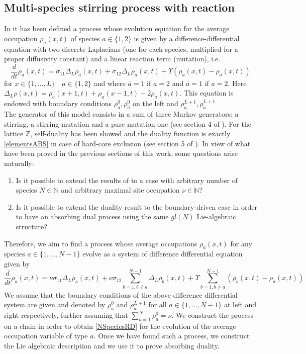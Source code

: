 \documentclass[10pt]{article}
\numberwithin{equation}{section}
\numberwithin{equation}{subsection}
\begin{document}
\subsection{Multi-species stirring process with reaction} \label{Subsection-RD}
In \cite{casini2022uphill} it has been defined a process whose evolution equation for the average occupation $\rho_{a}(x,t)$ of species $a\in \{1,2\}$ is given by a difference-differential equation with two discrete Laplacians (one for each species, multiplied for a proper diffusivity constant) and a linear reaction term (mutation), i.e.
\begin{equation}\label{2SpeciesRD}
	\frac{d}{dt} \rho_{a}(x,t)=\sigma_{11}\Delta_{L}\rho_{a}(x,t)+\sigma_{12}\Delta_{L}\rho_{\overline{a}}(x,t)+\Upsilon\left(\rho_{\overline{a}}(x,t)-\rho_{a}(x,t)\right)
\end{equation} 
for $ x\in\{1,\ldots,L\}\quad a\in\{1,2\}$  and where $\overline{a}=1$ if $a=2$ and $\overline{a}=1$ if $a=2$. Here $\Delta_{L}\rho(x,t)=\rho_{a}(x+1,t)+\rho_{a}(x-1,t)-2\rho_{a}(x,t)$.
This equation is endowed with boundary conditions $\rho_{a}^{0},\rho_{\overline{a}}^{0}$ on the left and $\rho_{a}^{L+1},\rho_{\overline{a}}^{L+1}$ \\The generator of this model consists in a sum of three Markov generators: a stirring, a stirring-mutation and a pure mutation one (see section 4 of \cite{casini2022uphill}). For the lattice $\mathbb{Z}$, self-duality has been showed and the duality function is exactly \eqref{elementsABS} in case of hard-core exclusion (see section 5 of \cite{casini2022uphill}). In view of what have been proved in the previous sections of this work, some questions arise naturally:
\begin{enumerate}
		\item Is it possible to extend the results of \cite{casini2022uphill} to a case with arbitrary number of species $N\in \mathbb{N}$ and arbitrary maximal site occupation $\nu\in \mathbb{N}$?
			\item Is it possible to extend the duality result to the boundary-driven case in order to have an absorbing dual process using the same $gl(N)$ Lie-algebraic structure?
\end{enumerate}
Therefore, we aim to find a process whose average occupations $\rho_{a}(x,t)$ for any species $a\in\{1,\ldots,N-1\}$ evolve as a system of difference differential equation given by 
\begin{equation}\label{NSpeciesRD}
	\frac{d}{dt} \rho_{a}(x,t)=\nu\sigma_{11}\Delta_{L}\rho_{a}(x,t)+\nu\sigma_{12}\sum_{b=1,b\neq a}^{N-1}\Delta_{L}\rho_{b}(x,t)+\Upsilon\sum_{b=1,b\neq a}^{N-1}\left(\rho_{b}(x,t)-\rho_{a}(x,t)\right)
\end{equation} 
 We assume that the boundary conditions of the above difference differential system are given and denoted by $\rho_{a}^{0}$ and $\rho_{a}^{L+1}$ for all $a\in\{1,\ldots,N-1\}$ at left and right respectively, further assuming that $\sum_{a=1}^{N}\rho_{a}^{0}=\nu$.
 We construct the process on a chain in order to obtain \eqref{NSpeciesRD} for the evolution of the average occupation variable of type $a$. Once we have found such a process, we construct the Lie algebraic description and we use it to prove absorbing duality.
\end{document}
